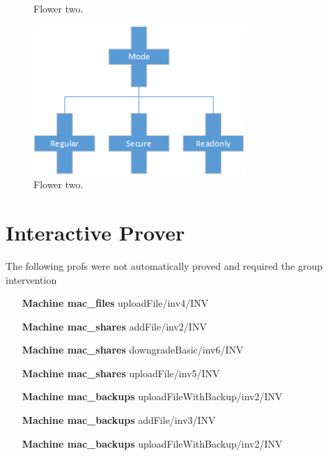 \documentclass[paper=a4, fontsize=11pt]{scrartcl} %
\numberwithin{equation}{section} %
\numberwithin{figure}{section} %
\numberwithin{table}{section} %
\begin{document}
\begin{figure}[h]
\begin{minipage}[b]{0.2\textwidth}
    \caption{Flower two.}
  \end{minipage}
  \hfill
  \begin{minipage}[b]{0.35\textwidth}
    \includegraphics[width=\textwidth]{sig_modes.png}
    \caption{Flower two.}
  \end{minipage}
\end{figure}

\section{Interactive Prover}
The following profs were not automatically proved and required the group intervention
\begin{multicols}{2}
\begin{itemize}
	\item[\textbf{Machine mac\_files}] uploadFile/inv4/INV
	\item[\textbf{Machine mac\_shares}] addFile/inv2/INV
	\item[\textbf{Machine mac\_shares}] downgradeBasic/inv6/INV
	\item[\textbf{Machine mac\_shares}] uploadFile/inv5/INV
	\item[\textbf{Machine mac\_backups}] uploadFileWithBackup/inv2/INV
	\item[\textbf{Machine mac\_backups}] addFile/inv3/INV
	\item[\textbf{Machine mac\_backups}] uploadFileWithBackup/inv2/INV
	\item[]
\end{itemize}
\end{multicols}
\end{document}
